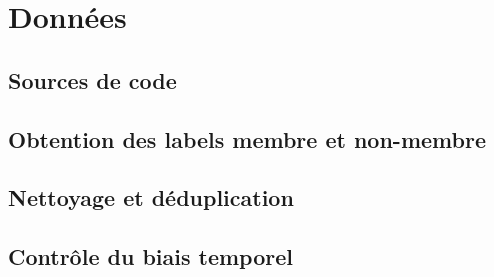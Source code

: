 \section{Données}\label{sec:donnees}
	\subsection{Sources de code}\label{sec:donnees-sources}
	\subsection{Obtention des labels membre et non-membre}\label{sec:donnees-labels}
	\subsection{Nettoyage et déduplication}\label{sec:donnees-dedup}
	\subsection{Contrôle du biais temporel}\label{sec:donnees-biais}

